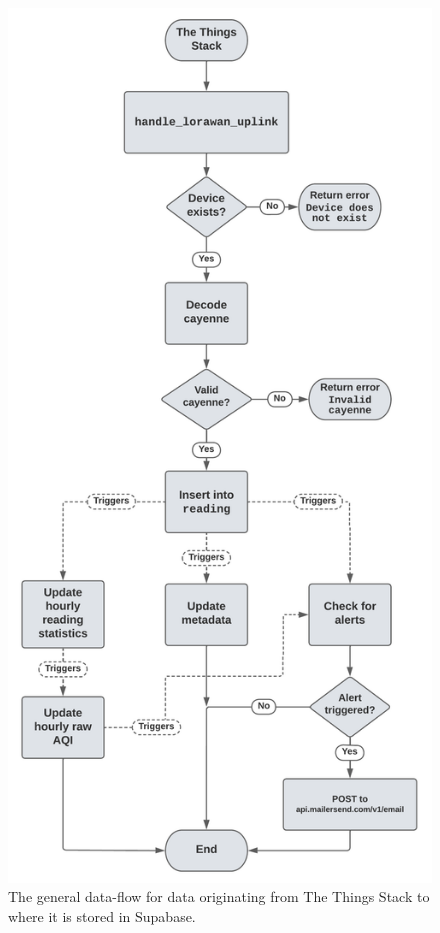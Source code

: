 \documentclass[conference]{IEEEtran}
\begin{document}
\begin{figure}
    \centering
    \includegraphics[scale=0.45]{img/db-dataflow.png}
    \caption{The general data-flow for data originating from The Things Stack to where it is stored in Supabase.}
    \label{fig:dataflow}
\end{figure}
\end{document}
